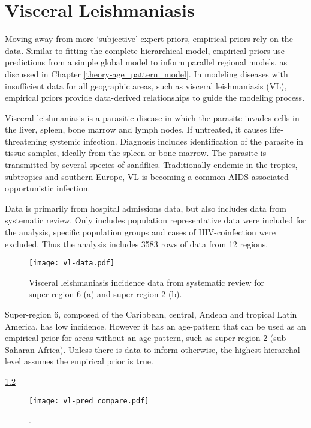 \chapter{Visceral Leishmaniasis}
\label{applications-priors_empirical}

Moving away from more `subjective' expert priors, empirical priors rely on the data.  Similar to fitting the complete hierarchical model, empirical priors use predictions from a simple global model to inform parallel regional models, as discussed in Chapter \ref{theory-age_pattern_model}.  In modeling diseases with insufficient data for all geographic areas, such as visceral leishmaniasis (VL), empirical priors provide data-derived relationships to guide the modeling process.

Visceral leishmaniasis is a parasitic disease in which the parasite invades cells in the liver, spleen, bone marrow and lymph nodes.  If untreated, it causes life-threatening systemic infection.  Diagnosis includes identification of the parasite in tissue samples, ideally from the spleen or bone marrow.  The parasite is transmitted by several species of sandflies.  Traditionally  endemic in the tropics, subtropics and southern Europe, VL is becoming a common AIDS-associated opportunistic infection.

Data is primarily from hospital admissions data, but also includes data from systematic review.  Only includes population representative data were included for the analysis, specific population groups and cases of HIV-coinfection were excluded.  Thus the analysis includes 3583 rows of data from 12 regions.

    \begin{figure}[h]
        \begin{center}
            \texttt{[image: vl-data.pdf]}
            \caption{Visceral leishmaniasis incidence data from systematic review for super-region 6 (a) and super-region 2 (b).}
            \label{fig:app-vl data}
        \end{center}
    \end{figure}

Super-region 6, composed of the Caribbean, central, Andean and tropical Latin America, has low incidence.  However it has an age-pattern that can be used as an empirical prior for areas without an age-pattern, such as super-region 2 (sub-Saharan Africa).  Unless there is data to inform otherwise, the highest hierarchal level assumes the empirical prior is true.

\ref{fig:app-vl pred compare}

    \begin{figure}[h]
        \begin{center}
            \texttt{[image: vl-pred\_compare.pdf]}
            \caption{.}
            \label{fig:app-vl pred compare}
        \end{center}
    \end{figure} 